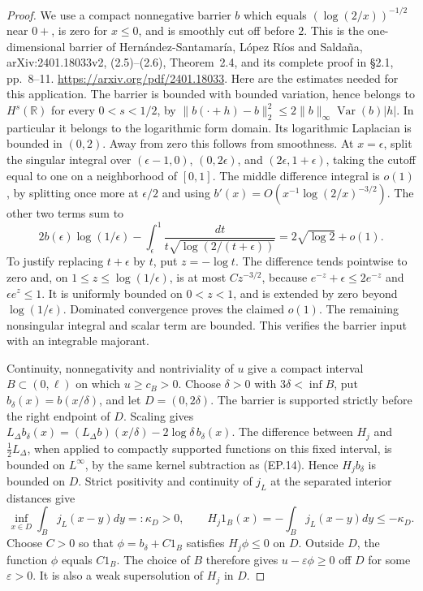 \begin{proof}
We use a compact nonnegative barrier \(b\) which equals
\((\log(2/x))^{-1/2}\) near \(0+\), is zero for \(x\leq0\),
and is smoothly cut off before \(2\).
This is the one-dimensional barrier of
Hern\'andez-Santamar\'ia, L\'opez R\'ios and Salda\~na,
arXiv:2401.18033v2, (2.5)--(2.6), Theorem~2.4,
and its complete proof in \S2.1, pp.~8--11.
\url{https://arxiv.org/pdf/2401.18033}.
Here are the estimates needed for this application.
The barrier is bounded with bounded variation, hence belongs to
\(H^s(\mathbb R)\) for every \(0<s<1/2\), by
\(\|b(\cdot+h)-b\|_2^2\leq2\|b\|_\infty
\operatorname{Var}(b)|h|\).
In particular it belongs to the logarithmic form domain.
Its logarithmic Laplacian is bounded in \((0,2)\).
Away from zero this follows from smoothness.  At \(x=\epsilon\),
split the singular integral over
\((\epsilon-1,0)\), \((0,2\epsilon)\), and
\((2\epsilon,1+\epsilon)\), taking the cutoff equal to one
on a neighborhood of \([0,1]\).
The middle difference integral is \(o(1)\), by splitting once
more at \(\epsilon/2\) and using
\(b'(x)=O(x^{-1}\log(2/x)^{-3/2})\).
The other two terms sum to
\[
 2b(\epsilon)\log(1/\epsilon)
 -\int_\epsilon^1\frac{dt}{t\sqrt{\log(2/(t+\epsilon))}}
                     =2\sqrt{\log2}+o(1).
                                                        \tag{RN.20}
\]
To justify replacing \(t+\epsilon\) by \(t\), put
\(z=-\log t\).  The difference tends pointwise to zero and,
on \(1\leq z\leq\log(1/\epsilon)\), is at most
\(Cz^{-3/2}\), because
\(e^{-z}+\epsilon\leq2e^{-z}\) and
\(\epsilon e^z\leq1\).
It is uniformly bounded on \(0<z<1\), and is extended by zero
beyond \(\log(1/\epsilon)\).
Dominated convergence proves the claimed \(o(1)\).
The remaining nonsingular integral and scalar term are bounded.
This verifies the barrier input with an integrable majorant.

Continuity, nonnegativity and nontriviality of \(u\) give a compact
interval \(B\subset(0,\ell)\) on which \(u\geq c_B>0\).
Choose \(\delta>0\) with \(3\delta<\inf B\), put
\(b_\delta(x)=b(x/\delta)\), and let \(D=(0,2\delta)\).
The barrier is supported strictly before the right endpoint of \(D\).
Scaling gives
\(L_\Delta b_\delta(x)=(L_\Delta b)(x/\delta)
 -2\log\delta\,b_\delta(x)\).
The difference between \(H_j\) and \(\tfrac12L_\Delta\),
when applied to compactly supported functions on this fixed interval,
is bounded on \(L^\infty\), by the same kernel subtraction
as (EP.14).  Hence \(H_jb_\delta\) is bounded on \(D\).
Strict positivity and continuity of \(j_L\) at the separated
interior distances give
\[
 \inf_{x\in D}\int_Bj_L(x-y)dy=:\kappa_D>0,
 \qquad H_j1_B(x)=-\int_Bj_L(x-y)dy\leq-\kappa_D.
                                                        \tag{RN.21}
\]
Choose \(C>0\) so that
\(\phi=b_\delta+C1_B\) satisfies \(H_j\phi\leq0\) on \(D\).
Outside \(D\), the function \(\phi\) equals \(C1_B\).
The choice of \(B\) therefore gives
\(u-\varepsilon\phi\geq0\) off \(D\) for some \(\varepsilon>0\).
It is also a weak supersolution of \(H_j\) in \(D\).


\end{proof}
